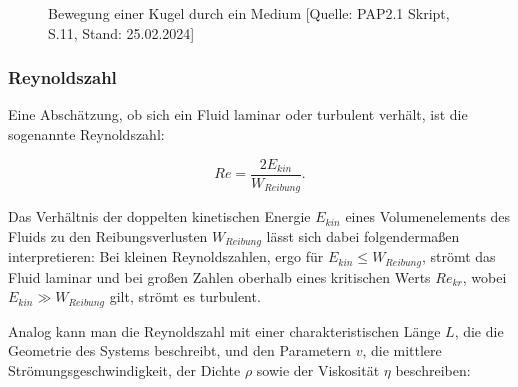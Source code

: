 \documentclass{article}
\begin{document}
\begin{figure}[!h]
  \centering
  \hfill
  \hfill
  \caption{Bewegung einer Kugel durch ein Medium [Quelle: PAP2.1 Skript, S.11, Stand: 25.02.2024]}
  \label{fig:LaminarUndTurbulent}
\end{figure}

\subsubsection{Reynoldszahl}

Eine Abschätzung, ob sich ein Fluid laminar oder turbulent verhält, ist die sogenannte Reynoldszahl:

\begin{equation}
    Re = \frac{2 E_{kin}}{W_{Reibung}}.
    \label{eq:Reynolds}
\end{equation}

Das Verhältnis der doppelten kinetischen Energie $E_{kin}$ eines Volumenelements des Fluids zu den Reibungsverlusten $W_{Reibung}$ lässt sich dabei folgendermaßen interpretieren: Bei kleinen Reynoldszahlen, ergo für $E_{kin} \leq W_{Reibung}$, strömt das Fluid laminar und bei großen Zahlen oberhalb eines kritischen Werts $Re_{kr}$, wobei $E_{kin} \gg W_{Reibung}$ gilt, strömt es turbulent. 

Analog kann man die Reynoldszahl mit einer charakteristischen Länge $L$, die die Geometrie des Systems beschreibt, und den Parametern $v$, die mittlere Strömungsgeschwindigkeit, der Dichte $\rho$ sowie der Viskosität $\eta$ beschreiben:
\end{document}
